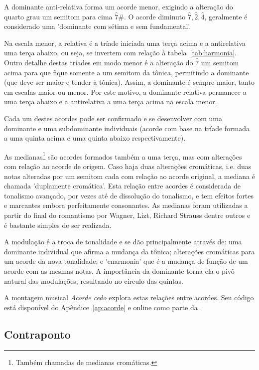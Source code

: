 A dominante anti-relativa forma um acorde menor, exigindo a alteração do quarto grau um semitom para cima $\hat{7}\#$. O acorde diminuto $\hat{7},\hat{2},\hat{4}$, geralmente é considerado uma 'dominante com sétima e sem fundamental'.\cite{Koellheuteur}

Na escala menor, a relativa é a tríade iniciada uma terça acima e a antirelativa uma terça abaixo,
ou seja, se invertem com relação à tabela~\ref{tab:harmonia}. Outro detalhe destas tríades em modo
menor é a alteração do $\hat{7}$ um semitom acima para que fique somente a um semitom da tônica,
permitindo a dominante (que deve ser maior e tender à tônica). Assim, a dominante é sempre maior, tanto em escalas maior ou menor. Por este motivo, a dominante relativa permanece a uma terça abaixo e a antirelativa a uma terça acima na escala menor.

Cada um destes acordes pode ser confirmado e se desenvolver com uma dominante e uma subdominante individuais (acorde com base na tríade formada a uma quinta acima e uma quinta abaixo respectivamente).

As medianas\footnote{Também chamadas de medianas cromáticas.} são acordes formados também a uma terça, mas com alterações com relação ao acorde de origem. Caso haja duas alterações cromáticas, i.e. duas notas alteradas por um semitom cada com relação ao acorde original, a mediana é chamada 'duplamente cromática'. Esta relação entre acordes é considerada de tonalismo avançado, por vezes até de dissolução do tonalismo, e tem efeitos fortes e marcantes embora perfeitamente consonantes. As medianas foram utilizadas a partir do final do romantismo por Wagner, Lizt, Richard Strauss dentre outros e é bastante simples de ser realizada.\cite{Harmonia,Schachter}

A modulação é a troca de tonalidade e se dão principalmente através de: uma dominante individual que afirma a mudança da tônica; alterações cromáticas para um acorde da nova tonalidade; e 'enarmonia' que é a mudança de função de um acorde com as mesmas notas. A importância da dominante torna ela o pivô natural das modulações, resultando no círculo das quintas.\cite{Harmonia,Schachter,Koellheuteur,Harmony}

A montagem musical \emph{Acorde cedo} explora estas relações entre acordes. Seu código está disponível do Apêndice~\ref{ap:acorde} e online como parte da \massa.\cite{MASSA}


\subsection{Contraponto}

